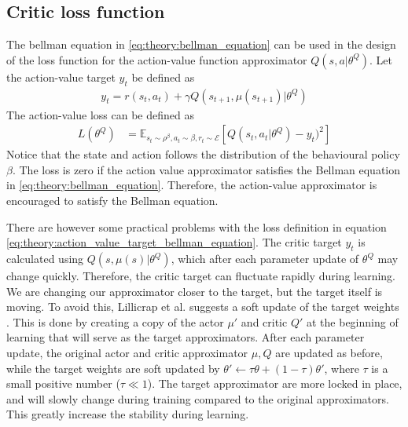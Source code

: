 \documentclass[class=book, crop=false, 11pt]{standalone}
\begin{document}
\subsection{Critic loss function}
The bellman equation in \eqref{eq:theory:bellman_equation} can be used in the design of the loss function for the action-value function approximator $Q(s,a|\theta^{Q})$. Let the action-value target $y_{t}$ be defined as 
\begin{equation}
   \begin{aligned}\label{eq:theory:action_value_target_bellman_equation}
y_{t} = r(s_{t},a_{t}) + \gamma Q(s_{t+1},\mu(s_{t+1})|\theta^{Q})
\end{aligned} 
\end{equation}
The action-value loss can be defined as 
\begin{equation}
   \begin{aligned}\label{eq:theory:action_value_loss_bellman_equation}
L(\theta^{Q}) 
&= \mathbb{E}_
{s_{t}\sim\rho^{\beta},a_{t} \sim \beta, r_{t} \sim \mathcal{E}}
[Q(s_{t},a_{t}|\theta^{Q})- y_{t})^{2}]
\end{aligned} 
\end{equation}
Notice that the state and action follows the distribution of the behavioural policy $\beta$. The loss is zero if the action value approximator satisfies the Bellman equation in \eqref{eq:theory:bellman_equation}. Therefore, the action-value approximator is encouraged to satisfy the Bellman equation.

There are however some practical problems with the loss definition in equation \eqref{eq:theory:action_value_target_bellman_equation}. The critic target $y_{t}$ is calculated using $Q(s,\mu(s)|\theta^{Q})$, which after each parameter update of $\theta^{Q}$ may change quickly. Therefore, the critic target can fluctuate rapidly during learning. We are changing our approximator closer to the target, but the target itself is moving. To avoid this, Lillicrap et al. suggests a soft update of the target weights \cite{DBLP:journals/corr/LillicrapHPHETS15}. This is done by creating a copy of the actor $\mu'$ and critic $Q'$ at the beginning of learning that will serve as the target approximators. After each parameter update, the original actor and critic approximator $\mu,Q$ are updated as before, while the target weights are soft updated by $\theta' \leftarrow \tau\theta + (1-\tau)\theta'$, where $\tau$ is a small positive number ($\tau  \ll 1$). The target approximator are more locked in place, and will slowly change during training compared to the original approximators. This greatly increase the stability during learning. 
\end{document}
